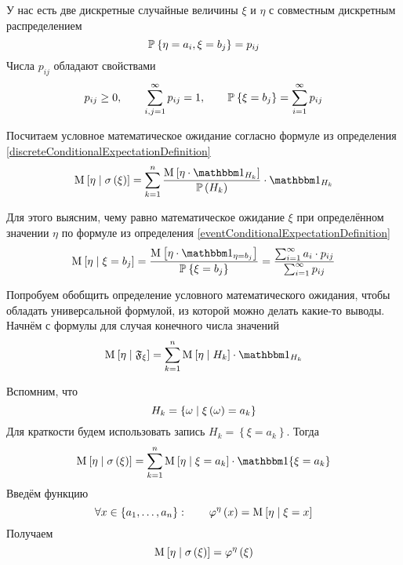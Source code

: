 \begin{example}\label{discreteConditionalExpectationExample}
  У нас есть две дискретные случайные величины $\xi$ и $\eta$
  с совместным дискретным распределением
  $$\mathbb{P}_{{}}\left\{ \eta = a_i, \xi = b_j \right\} = p_{ij}$$
  Числа $p_{ij}$ обладают свойствами
  $$p_{ij} \ge 0, \qquad \sum_{i,j=1}^\infty p_{ij} = 1,
      \qquad \mathbb{P}_{{}}\left\{ \xi = b_j \right\} = \sum_{i=1}^\infty p_{ij}$$

  Посчитаем условное математическое ожидание согласно формуле
  из определения \eqref{discreteConditionalExpectationDefinition}
  $$\Mean{\eta \mcond \sigma\left( \xi \right)} = \sum_{k=1}^n
      \frac{\Mean{\eta \cdot \indicatorof{H_k}}}{\probability{H_k}}
      \cdot \indicatorof{H_k}$$

  Для этого выясним, чему равно математическое ожидание $\xi$
  при определённом значении $\eta$ по формуле из определения
  \eqref{eventConditionalExpectationDefinition}
  $$\Mean{\eta \mcond \xi = b_j}
      = \frac{\Mean{\eta \cdot \indicatorof{\eta = b_j}}}{
      \Probability{\xi = b_j}}
      = \frac{\sum_{i=1}^{\infty} a_i \cdot p_{ij}}{
      \sum_{i=1}^{\infty} p_{ij}}$$
\end{example}

Попробуем обобщить определение условного математического ожидания,
чтобы обладать универсальной формулой, из которой можно делать какие-то выводы.
Начнём с формулы для случая конечного числа значений
$$\Mean{ \eta \mcond \mathfrak{F}_\xi }
  = \sum_{k=1}^n \Mean{ \eta \mcond H_k } \cdot \indicatorof{H_k}$$

Вспомним, что
\begin{equation*}
  H_k = \left\{ \omega \;\middle|\; \xi\left( \omega \right) = a_k \right\}
\end{equation*}
Для краткости будем использовать запись $H_k = \left\{ \xi = a_k \right\}$.
Тогда
\begin{equation*}
  \Mean{\eta \mcond \sigma\left( \xi \right)}
  = \sum_{k=1}^{n} \Mean{\eta \mcond \xi = a_k} \cdot \Indicator{\xi = a_k}
\end{equation*}
Введём функцию
\begin{equation*}
  \forall x \in \left\{ a_1, \dots, a_n \right\}:\qquad
  \varphi^{\eta}\left( x \right) = \operatorname{M}_{} \left[ \eta \;\middle|\; \xi = x \right]
\end{equation*}
Получаем
\begin{equation*}
  \operatorname{M}_{} \left[ \eta \;\middle|\; \sigma\left( \xi \right) \right]
  = \varphi^{\eta}\left( \xi \right)
\end{equation*}

